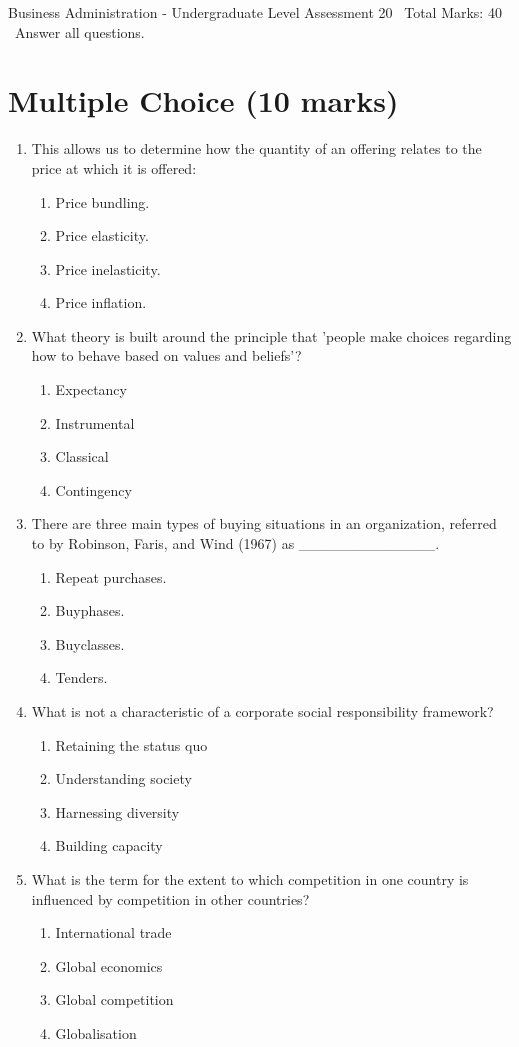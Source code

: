 \documentclass[12pt]{article}
\begin{document}
\begin{center}
Business Administration - Undergraduate Level Assessment 20 \
Total Marks: 40 \
Answer all questions.
\end{center}

\section*{Multiple Choice (10 marks)}
\begin{enumerate}[label=\arabic*.]
\item This allows us to determine how the quantity of an offering relates to the price at which it is offered:
\begin{enumerate}[label=(\alph*)]
    \item Price bundling.
    \item Price elasticity.
    \item Price inelasticity.
    \item Price inflation.
\end{enumerate}
\item What theory is built around the principle that 'people make choices regarding how to behave based on values and beliefs'?
\begin{enumerate}[label=(\alph*)]
    \item Expectancy
    \item Instrumental
    \item Classical
    \item Contingency
\end{enumerate}
\item There are three main types of buying situations in an organization, referred to by Robinson, Faris, and Wind (1967) as \_\_\_\_\_\_\_\_\_\_\_\_\_.
\begin{enumerate}[label=(\alph*)]
    \item Repeat purchases.
    \item Buyphases.
    \item Buyclasses.
    \item Tenders.
\end{enumerate}
\item What is not a characteristic of a corporate social responsibility framework?
\begin{enumerate}[label=(\alph*)]
    \item Retaining the status quo
    \item Understanding society
    \item Harnessing diversity
    \item Building capacity
\end{enumerate}
\item What is the term for the extent to which competition in one country is influenced by competition in other countries?
\begin{enumerate}[label=(\alph*)]
    \item International trade
    \item Global economics
    \item Global competition
    \item Globalisation
\end{enumerate}
\end{enumerate}
\end{document}
